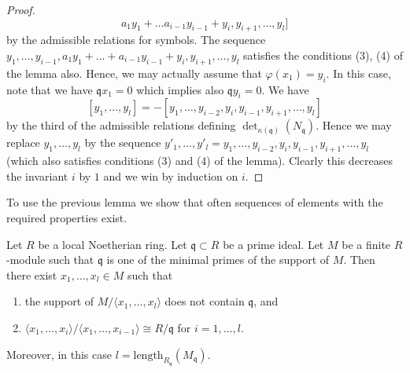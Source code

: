 \begin{proof}
$$a_1y_1 + \ldots a_{i - 1}y_{i - 1} + y_i, y_{i + 1}, \ldots, y_l]
$$
by the admissible relations for symbols. The sequence
$y_1, \ldots, y_{i - 1},
a_1y_1 + \ldots + a_{i - 1}y_{i - 1} + y_i, y_{i + 1}, \ldots, y_l$
satisfies the conditions (3), (4) of the lemma also.
Hence, we may actually
assume that $\varphi(x_1) = y_i$. In this case, note that we have
$\mathfrak q x_1 = 0$ which implies also $\mathfrak q y_i = 0$.
We have
$$
[y_1, \ldots, y_l] =
- [y_1, \ldots, y_{i - 2}, y_i, y_{i - 1}, y_{i + 1}, \ldots, y_l]
$$
by the third of the admissible relations defining
$\det_{\kappa(\mathfrak q)}(N_{\mathfrak q})$. Hence we may
replace $y_1, \ldots, y_l$ by
the sequence
$y'_1, \ldots, y'_l =
y_1, \ldots, y_{i - 2}, y_i, y_{i - 1}, y_{i + 1}, \ldots, y_l$
(which also satisfies conditions (3) and (4) of the lemma).
Clearly this decreases the invariant $i$ by $1$ and we win by induction
on $i$.
\end{proof}

\noindent
To use the previous lemma we show that often sequences of elements
with the required properties exist.

\begin{lemma}
\label{lemma-good-sequence-exists}
Let $R$ be a local Noetherian ring.
Let $\mathfrak q \subset R$ be a prime ideal.
Let $M$ be a finite $R$-module such that
$\mathfrak q$ is one of the minimal primes of the support of $M$.
Then there exist $x_1, \ldots, x_l \in M$ such that
\begin{enumerate}
\item the support of $M / \langle x_1, \ldots, x_l\rangle$ does not contain
$\mathfrak q$, and
\item $\langle x_1, \ldots, x_i\rangle / \langle x_1, \ldots, x_{i - 1}\rangle
\cong R/\mathfrak q$ for $i = 1, \ldots, l$.
\end{enumerate}
Moreover, in this case $l = \text{length}_{R_\mathfrak q}(M_\mathfrak q)$.
\end{lemma}

